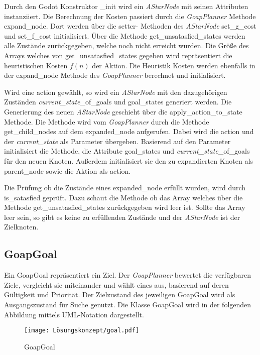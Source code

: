 Durch den Godot Konstruktor \_init wird ein \textit{AStarNode} mit seinen Attributen instanziiert. Die Berechnung der Kosten passiert durch die \textit{GoapPlanner} Methode expand\_node. Dort werden über die setter- Methoden des \textit{AStarNode} set\_g\_cost und set\_f\_cost initialisiert. \"{U}ber die Methode get\_unsatasfied\_states werden alle Zustände zurückgegeben, welche noch nicht erreicht wurden. Die Grö\ss{}e des Arrays welches von get\_unsatasfied\_states gegeben wird repräsentiert die heuristischen Kosten $f(n)$ der Aktion. Die Heuristik Kosten werden ebenfalls in der expand\_node Methode des \textit{GoapPlanner} berechnet und initialisiert.

Wird eine action gewählt, so wird ein \textit{AStarNode} mit den dazugehörigen Zuständen \textit{current\_state}\_of\_goals und goal\_states generiert werden. Die Generierung des neuen \textit{AStarNode} geschieht über die apply\_action\_to\_state Methode. Die Methode wird vom \textit{GoapPlanner} durch die Methode get\_child\_nodes auf dem expanded\_node aufgerufen. Dabei wird die action und der \textit{current\_state} als Parameter übergeben. Basierend auf den Parameter initialisiert die Methode, die Attribute goal\_states und \textit{current\_state}\_of\_goals für den neuen Knoten. Au\ss{}erdem initialisiert sie den zu expandierten Knoten als parent\_node sowie die Aktion als action.

Die Prüfung ob die Zustände eines expanded\_node erfüllt wurden, wird durch is\_satasfied geprüft. Dazu schaut die Methode ob das Array welches über die Methode get\_unsatasfied\_states zurückgegeben wird leer ist. Sollte das Array leer sein, so gibt es keine zu erfüllenden Zustände und der \textit{AStarNode} ist der Zielknoten.


\subsection{GoapGoal}
\label{chap:goapgoal uml}

Ein GoapGoal repräsentiert ein Ziel. Der \textit{GoapPlanner} bewertet die verfügbaren Ziele, vergleicht sie miteinander und wählt eines aus, basierend auf deren Gültigkeit und Priorität. Der Zielzustand des jeweiligen GoapGoal wird als Ausgangszustand für Suche genutzt. Die Klasse GoapGoal wird in der folgenden Abbildung mittels UML-Notation dargestellt.

\begin{figure}[t]
  \centering
  \texttt{[image: Lösungskonzept/goal.pdf]}
	\captionsetup{justification=justified, format=plain}
  \caption{GoapGoal}
  \label{fig:GoapGoal}
\end{figure}

